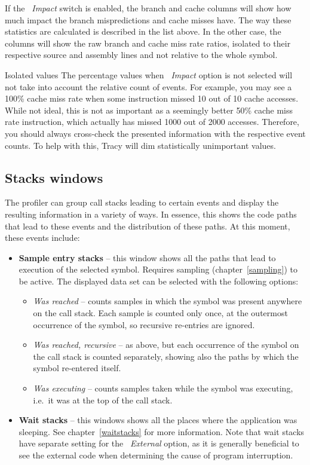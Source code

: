 \documentclass[hidelinks,titlepage,a4paper,twoside]{article}
\begin{document}
If the \emph{\faCarBurst{}~Impact} switch is enabled, the branch and cache columns will show how much impact the branch mispredictions and cache misses have. The way these statistics are calculated is described in the list above. In the other case, the columns will show the raw branch and cache miss rate ratios, isolated to their respective source and assembly lines and not relative to the whole symbol.

\begin{bclogo}[
noborder=true,
couleur=black!5,
logo=\bcattention
]{Isolated values}
The percentage values when \emph{\faCarBurst{}~Impact} option is not selected will not take into account the relative count of events. For example, you may see a 100\% cache miss rate when some instruction missed 10 out of 10 cache accesses. While not ideal, this is not as important as a seemingly better 50\% cache miss rate instruction, which actually has missed 1000 out of 2000 accesses. Therefore, you should always cross-check the presented information with the respective event counts. To help with this, Tracy will dim statistically unimportant values.
\end{bclogo}

\subsection{Stacks windows}
\label{stackwindows}

The profiler can group call stacks leading to certain events and display the resulting information in a variety of ways. In essence, this shows the code paths that lead to these events and the distribution of these paths. At this moment, these events include:

\begin{itemize}
\item \textbf{Sample entry stacks} -- this window shows all the paths that lead to execution of the selected symbol. Requires sampling (chapter~\ref{sampling}) to be active. The displayed data set can be selected with the following options:
\begin{itemize}
\item \emph{Was reached} -- counts samples in which the symbol was present anywhere on the call stack. Each sample is counted only once, at the outermost occurrence of the symbol, so recursive re-entries are ignored.
\item \emph{Was reached, recursive} -- as above, but each occurrence of the symbol on the call stack is counted separately, showing also the paths by which the symbol re-entered itself.
\item \emph{Was executing} -- counts samples taken while the symbol was executing, i.e.\ it was at the top of the call stack.
\end{itemize}
\item \textbf{Wait stacks} -- this windows shows all the places where the application was sleeping. See chapter~\ref{waitstacks} for more information. Note that wait stacks have separate setting for the \emph{\faShieldHalved{}~External} option, as it is generally beneficial to see the external code when determining the cause of program interruption.
\end{itemize}
\end{document}
